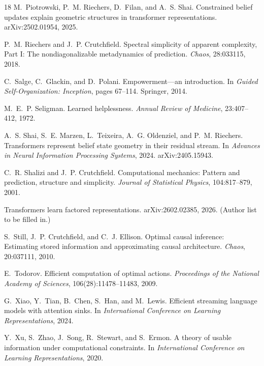\documentclass[11pt]{article}
\begin{document}
\begin{thebibliography}{18}
M.~Piotrowski, P.~M. Riechers, D.~Filan, and A.~S. Shai.
\newblock Constrained belief updates explain geometric structures in transformer representations.
\newblock arXiv:2502.01954, 2025.

P.~M. Riechers and J.~P. Crutchfield.
\newblock Spectral simplicity of apparent complexity, Part I: The nondiagonalizable metadynamics of prediction.
\newblock \emph{Chaos}, 28:033115, 2018.

C.~Salge, C.~Glackin, and D.~Polani.
\newblock Empowerment---an introduction.
\newblock In \emph{Guided Self-Organization: Inception}, pages 67--114. Springer, 2014.

M.~E.~P. Seligman.
\newblock Learned helplessness.
\newblock \emph{Annual Review of Medicine}, 23:407--412, 1972.

A.~S. Shai, S.~E. Marzen, L.~Teixeira, A.~G. Oldenziel, and P.~M. Riechers.
\newblock Transformers represent belief state geometry in their residual stream.
\newblock In \emph{Advances in Neural Information Processing Systems}, 2024.
\newblock arXiv:2405.15943.

C.~R. Shalizi and J.~P. Crutchfield.
\newblock Computational mechanics: Pattern and prediction, structure and simplicity.
\newblock \emph{Journal of Statistical Physics}, 104:817--879, 2001.

Transformers learn factored representations.
\newblock arXiv:2602.02385, 2026.
\newblock (Author list to be filled in.)

S.~Still, J.~P. Crutchfield, and C.~J. Ellison.
\newblock Optimal causal inference: Estimating stored information and approximating causal architecture.
\newblock \emph{Chaos}, 20:037111, 2010.

E.~Todorov.
\newblock Efficient computation of optimal actions.
\newblock \emph{Proceedings of the National Academy of Sciences}, 106(28):11478--11483, 2009.

G.~Xiao, Y.~Tian, B.~Chen, S.~Han, and M.~Lewis.
\newblock Efficient streaming language models with attention sinks.
\newblock In \emph{International Conference on Learning Representations}, 2024.

Y.~Xu, S.~Zhao, J.~Song, R.~Stewart, and S.~Ermon.
\newblock A theory of usable information under computational constraints.
\newblock In \emph{International Conference on Learning Representations}, 2020.

\end{thebibliography}
\end{document}
